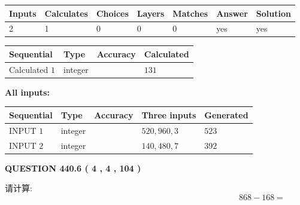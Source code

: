 \documentclass{ctexart}
\begin{document}
   
   
   
\noindent\begin{tabular}{|l|l|l|l|l|l|l|}
 \hline
Inputs & Calculates & Choices & Layers & Matches & Answer & Solution \\ \hline
 2  & 
 1  & 
 0
  & 
 0  & 
 0  & 
  yes & 
  yes 
  \\ \hline
 \end{tabular}
   
   
   
   
\noindent{}
   
   
  
  
\noindent\begin{tabular}{|l|l|l|l|}
\hline
 Sequential & Type & Accuracy & Calculated \\ 
\hline
 
 
  Calculated $  1 $ & integer &  & 
  $ 131 $ 
 \\  \hline  
 \end{tabular}
   
   
   
   
\noindent\vspace{0.1in}\hspace{-0.08in} {\textbf{\Large{All inputs: }}}
   
   
  
  
\noindent\begin{tabular}{|l|l|l|l|l|}
\hline
 Sequential & Type & Accuracy & Three inputs & Generated \\ 
\hline
 
 
  INPUT $  1 $ & integer &  & $
 520
 , 
 960
 , 
 3
 $ & $ 523 $ 
 \\  \hline  
 
 
  INPUT $  2 $ & integer &  & $
 140
 , 
 480
 , 
 7
 $ & $ 392 $ 
 \\  \hline  
 \end{tabular}
   
   
  
\vspace{0.2in}
  
{\textbf{\Large{QUESTION
440.6 
 ( 4 , 4 , 104 )
}}}
  
  
 
请计算:
\begin{equation}
868 -   %
168 = \nonumber
\end{equation}
 
 
 
\end{document}
